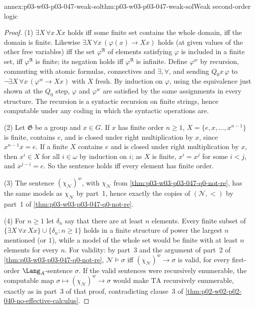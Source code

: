 \begin{annexitem}{annex:p03-w03-p03-047-weak-sol}{thm:p03-w03-p03-047-weak-sol}{Weak second-order logic}
\begin{proof}
(1) \(\exists X\,\forall x\,Xx\) holds iff some finite set contains the whole
domain, iff the domain is finite.  Likewise
\(\exists X\,\forall x\,(\varphi(x)\to Xx)\) holds (at given values of the
other free variables) iff the set \(\varphi^{\mathfrak A}\) of elements
satisfying \(\varphi\) is included in a finite set, iff
\(\varphi^{\mathfrak A}\) is finite; its negation holds iff
\(\varphi^{\mathfrak A}\) is infinite.  Define \(\varphi^w\) by recursion,
commuting with atomic formulas, connectives and \(\exists,\forall\), and
sending \(Q_0x\,\varphi\) to \(\neg\exists X\,\forall x\,(\varphi^w\to Xx)\)
with \(X\) fresh.  By induction on \(\varphi\), using the equivalence just
shown at the \(Q_0\) step, \(\varphi\) and \(\varphi^w\) are satisfied by the
same assignments in every structure.  The recursion is a syntactic
recursion on finite strings, hence computable under any coding in which the
syntactic operations are.

(2) Let \(\mathfrak G\) be a group and \(x\in G\).  If \(x\) has finite order
\(n\ge1\), \(X=\{e,x,\ldots,x^{n-1}\}\) is finite, contains \(e\), and is
closed under right multiplication by \(x\), since \(x^{n-1}x=e\).  If a
finite \(X\) contains \(e\) and is closed under right multiplication by
\(x\), then \(x^i\in X\) for all \(i\in\omega\) by induction on \(i\); as
\(X\) is finite, \(x^i=x^j\) for some \(i<j\), and \(x^{j-i}=e\).  So the
sentence holds iff every element has finite order.

(3) The sentence \((\chi_{\mathcal N})^w\), with \(\chi_{\mathcal N}\) from
\cref{thm:p03-w03-p03-047-q0-not-re}, has the same models as
\(\chi_{\mathcal N}\) by part~1, hence exactly the copies of
\((\mathcal N,<)\) by part~1 of \cref{thm:p03-w03-p03-047-q0-not-re}.

(4) For \(n\ge1\) let \(\delta_n\) say that there are at least \(n\)
elements.  Every finite subset of
\(\{\exists X\,\forall x\,Xx\}\cup\{\delta_n:n\ge1\}\) holds in a finite
structure of power the largest \(n\) mentioned (or \(1\)), while a model of
the whole set would be finite with at least \(n\) elements for every \(n\).
For validity: by part~3 and the argument of part~2 of
\cref{thm:p03-w03-p03-047-q0-not-re}, \(\mathcal N\models\sigma\) iff
\((\chi_{\mathcal N})^w\to\sigma\) is valid, for every first-order
\(\Lang_A\)-sentence \(\sigma\).  If the valid sentences were recursively
enumerable, the computable map \(\sigma\mapsto(\chi_{\mathcal N})^w\to\sigma\)
would make \(\mathrm{TA}\) recursively enumerable, exactly as in part~3 of
that proof, contradicting clause~3 of
\cref{thm:p02-w02-p02-040-no-effective-calculus}.


\end{proof}
\end{annexitem}
